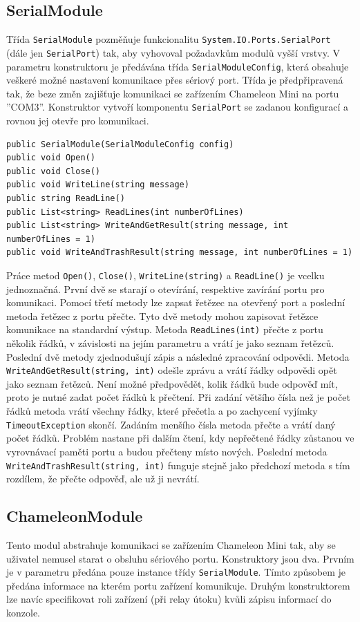 \subsection*{SerialModule}
Třída \verb|SerialModule| pozměňuje funkcionalitu \verb|System.IO.Ports.SerialPort| (dále jen \verb|SerialPort|) tak, aby vyhovoval požadavkům modulů vyšší vrstvy. V parametru konstruktoru je předávána třída \verb|SerialModuleConfig|, která obsahuje veškeré možné nastavení komunikace přes sériový port. Třída je předpřipravená tak, že beze změn zajišťuje komunikaci se zařízením Chameleon Mini na portu ''COM3''. Konstruktor vytvoří komponentu \verb|SerialPort| se zadanou konfigurací a rovnou jej otevře pro komunikaci.

\begin{lstlisting}[caption=Metody třídy \emph{SerialModule}, label={serialModuleMethods}]
public SerialModule(SerialModuleConfig config)
public void Open()
public void Close()
public void WriteLine(string message)
public string ReadLine()
public List<string> ReadLines(int numberOfLines)
public List<string> WriteAndGetResult(string message, int numberOfLines = 1)
public void WriteAndTrashResult(string message, int numberOfLines = 1)
\end{lstlisting}

Práce metod \verb|Open()|, \verb|Close()|, \verb|WriteLine(string)| a \verb|ReadLine()| je vcelku jednoznačná. První dvě se starají o otevírání, respektive zavírání portu pro komunikaci. Pomocí třetí metody lze zapsat řetězec na otevřený port a poslední metoda řetězec z portu přečte. Tyto dvě metody mohou zapisovat řetězce komunikace na standardní výstup. Metoda \verb|ReadLines(int)| přečte z portu několik řádků, v závislosti na jejím parametru a vrátí je jako seznam řetězců. Poslední dvě metody zjednodušují zápis a následné zpracování odpovědi. Metoda \verb|WriteAndGetResult(string, int)| odešle zprávu a vrátí řádky odpovědi opět jako seznam řetězců. Není možné předpovědět, kolik řádků bude odpověď mít, proto je nutné zadat počet řádků k přečtení. Při zadání většího čísla než je počet řádků metoda vrátí všechny řádky, které přečetla a po zachycení vyjímky \verb|TimeoutException| skončí. Zadáním menšího čísla metoda přečte a vrátí daný počet řádků. Problém nastane při dalším čtení, kdy nepřečtené řádky zůstanou ve vyrovnávací paměti portu a budou přečteny místo nových. Poslední metoda \verb|WriteAndTrashResult(string, int)| funguje stejně jako předchozí metoda s tím rozdílem, že přečte odpověď, ale už ji nevrátí.

\subsection*{ChameleonModule}
Tento modul abstrahuje komunikaci se zařízením Chameleon Mini tak, aby se uživatel nemusel starat o obsluhu sériového portu. Konstruktory jsou dva. Prvním je v parametru předána pouze instance třídy \verb|SerialModule|. Tímto způsobem je předána informace na kterém portu zařízení komunikuje. Druhým konstruktorem lze navíc specifikovat roli zařízení (při relay útoku) kvůli zápisu informací do konzole.

